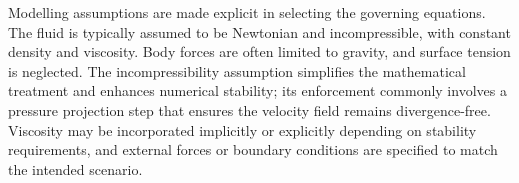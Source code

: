 Modelling assumptions are made explicit in selecting the governing equations. The fluid is typically assumed to be Newtonian and incompressible, with constant density and viscosity. Body forces are often limited to gravity, and surface tension is neglected. %
The incompressibility assumption simplifies the mathematical treatment and enhances numerical stability; its enforcement commonly involves a pressure projection step that ensures the velocity field remains divergence-free. Viscosity may be incorporated implicitly or explicitly depending on stability requirements, and external forces or boundary conditions are specified to match the intended scenario. %





